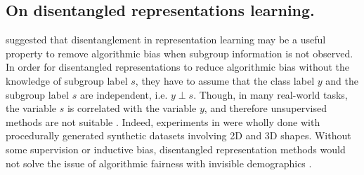 \subsection{On disentangled representations learning.}
\citet{locatello2019fairness} suggested that disentanglement in representation learning may be a useful property to remove algorithmic bias when subgroup information is not observed.
%
In order for disentangled representations to reduce algorithmic bias without the knowledge of subgroup label $s$, they have to assume that the class label $y$ and the subgroup label $s$ are independent, i.e. $y\perp s$.
%
Though, in many real-world tasks, the variable $s$ is correlated with the variable $y$, and therefore unsupervised methods are not suitable  \citep{jaiswal2018unsupervised,JaiWuAbdNat19}. 
%
Indeed, experiments in \citet{locatello2019fairness} were wholly done with procedurally generated synthetic datasets involving 2D and 3D shapes. 
%
Without some supervision or inductive bias, disentangled representation methods would not solve the issue of algorithmic fairness with invisible demographics \citep{locatello2019challenging}. 

